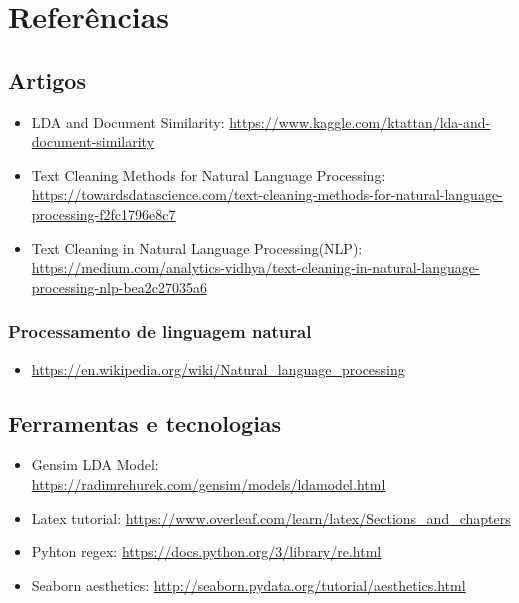 \section{Referências}

\subsection{Artigos}

\begin{itemize}
    \item LDA and Document Similarity: \url{https://www.kaggle.com/ktattan/lda-and-document-similarity}
    \item Text Cleaning Methods for Natural Language Processing: \url{https://towardsdatascience.com/text-cleaning-methods-for-natural-language-processing-f2fc1796e8c7}
    \item Text Cleaning in Natural Language Processing(NLP): \url{https://medium.com/analytics-vidhya/text-cleaning-in-natural-language-processing-nlp-bea2c27035a6}
\end{itemize}

\subsubsection{Processamento de linguagem natural}

\begin{itemize}
    \item \url{https://en.wikipedia.org/wiki/Natural_language_processing}
\end{itemize}

\subsection{Ferramentas e tecnologias}

\begin{itemize}
    \item Gensim LDA Model: \url{https://radimrehurek.com/gensim/models/ldamodel.html}
    \item Latex tutorial: \url{https://www.overleaf.com/learn/latex/Sections\_and\_chapters}
    \item Pyhton regex: \url{https://docs.python.org/3/library/re.html}
    \item Seaborn aesthetics: \url{http://seaborn.pydata.org/tutorial/aesthetics.html}
\end{itemize}